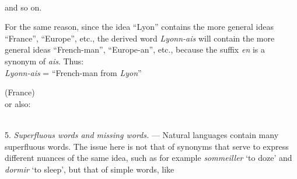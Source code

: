 \begin{sloppypar}
{{    \noindent
    \\[1ex]

    \noindent
    and so on.

    For the same reason, since the idea ``Lyon'' contains the more
    general ideas ``France'', ``Europe'', etc., the derived word
    \emph{Lyonn-ais} will contain the more general ideas ``French-man'',
    ``Europe-an'', etc., because the suffix \emph{en} is a synonym of
    \emph{ais}. Thus:\\[1ex]

    \emph{Lyonn-ais} = ``French-man from \emph{Lyon}''

    {\footnotesize (France)}\\[1ex]

    \noindent
    or also:

    \noindent
    \\[1ex]

    5. \emph{Superfluous words and missing words.} --- Natural
    languages contain many superfluous words. The issue here is not
    that of synonyms that serve to express different nuances of the
    same idea, such as for example \emph{sommeiller} `to doze' and
    \emph{dormir} `to sleep', but that of simple words, like


  }

}

\end{sloppypar}
